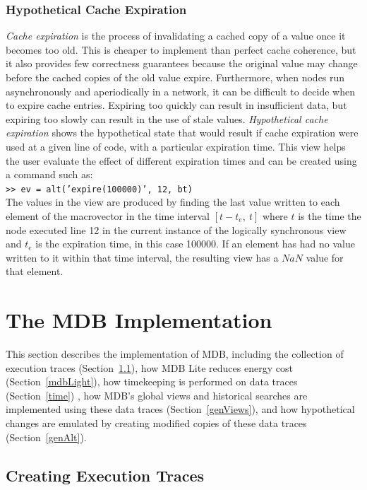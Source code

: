 \subsubsection{Hypothetical Cache Expiration} \label{expiration}

\emph{Cache expiration} is the process of invalidating a cached copy of a value once it
becomes too old.  This is cheaper to implement than perfect cache
coherence, but it also provides few correctness
guarantees because the original value may change before the cached copies of the
old value expire.  Furthermore, when nodes run asynchronously and aperiodically
in a network, it can be difficult to decide when to expire cache entries.
Expiring too quickly can result in insufficient data, but expiring too slowly
can result in the use of stale values.  \emph{Hypothetical cache expiration} shows
the hypothetical state that would result if cache expiration were used at a
given line of code, with a particular expiration time.  This view helps
the user evaluate the effect of different expiration times and can be created
using a command such as:
\\
{\small\indent\tt >> ev = alt('expire(100000)', 12, bt)}\\
The values in the view are produced by finding the last value written
to each element of the macrovector in the time interval $[t-t_{e},~ t]$
where $t$ is the time the node executed line 12 in the current
instance of the logically
synchronous view and $t_{e}$ is the expiration time, in
this case 100000\us.  If an element has had no value written to it
within that time interval, the resulting view has a $NaN$ value for
that element. 

\section{The MDB Implementation} \label{implementation}

This section describes the implementation of MDB, including the collection
of execution traces (Section~\ref{traces}), how MDB Lite reduces energy cost
(Section~\ref{mdbLight}), how timekeeping is performed on data traces
(Section~\ref{time}) , how MDB's global views and historical searches are
implemented using these data traces (Section~\ref{genViews}), and how
hypothetical changes are emulated by creating modified copies of these data
traces (Section~\ref{genAlt}).
 
\subsection{Creating Execution Traces} \label{traces}


